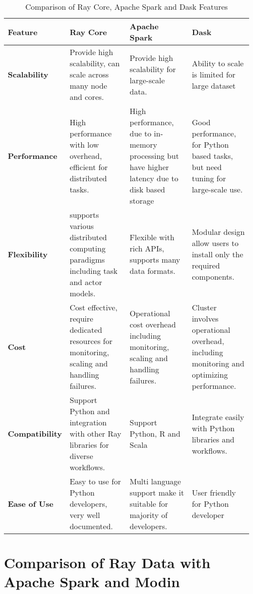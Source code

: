 \begin{table}[h]
\centering

\begin{tabular}{|p{2.6cm}|p{4cm}|p{4cm}|p{4cm}|}
\hline
\textbf{Feature} & \textbf{Ray Core} & \textbf{Apache Spark} & \textbf{Dask} \\
\hline
\textbf{Scalability} & Provide high scalability, can scale across many node and cores. \cite{ray_doc} & Provide high scalability for large-scale data. \cite{apache_spark}& Ability to scale is limited for large dataset \cite{dask_docs} \\
\hline
\textbf{Performance} & High performance with low overhead, efficient for distributed tasks. \cite{ray_doc} & High performance, due to in-memory processing but have higher latency due to disk based storage \cite{apache_spark}&Good performance, for Python based tasks, but need tuning for large-scale use. \cite{dask_docs} \\
\hline
\textbf{Flexibility} & supports various distributed computing paradigms including task and actor models. \cite{ray_doc}& Flexible with rich APIs, supports many data formats. \cite{apache_spark}& Modular design allow users to install only the required components. \cite{dugre2019performance}\\
\hline
\textbf{Cost} & Cost effective, require dedicated resources for monitoring, scaling and handling failures. \cite{ray_doc} & Operational cost overhead including monitoring, scaling and handling failures. \cite{apache_spark}& Cluster involves operational overhead, including monitoring and optimizing performance. \cite{dask_docs}\\
\hline
\textbf{Compatibility} & Support Python and integration with other Ray libraries for diverse workflows. \cite{ray_doc} & Support Python, R and Scala \cite{apache_spark}& Integrate easily with Python libraries and workflows. \cite{dask_docs} \\
\hline
\textbf{Ease of Use} & Easy to use for Python developers, very well documented. & Multi language support make it suitable for majority of developers. & User friendly for Python developer\\
\hline
\end{tabular}
\caption{Comparison of Ray Core, Apache Spark and Dask Features}
\label{tab:table1}
\end{table}

\section{Comparison of Ray Data with Apache Spark and Modin}


